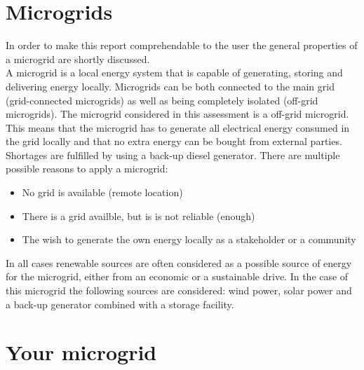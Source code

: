 \documentclass{article}[11pt]
\begin{document}
\begin{large}  \end{large}

\section*{Microgrids}\begin{multicols}{2}\setlength{\parindent}{0pt}

In order to make this report comprehendable to the user the general properties of a microgrid are shortly discussed.\\ A microgrid is a local energy system that is capable of generating, storing and delivering energy locally. Microgrids can be both connected to the main grid (grid-connected microgrids) as well as being completely isolated (off-grid microgrids). The microgrid considered in this assessment is a off-grid microgrid. This means that the microgrid has to generate all electrical energy consumed in the grid locally and that no extra energy can be bought from external parties. Shortages are fulfilled by using a back-up diesel generator. There are multiple possible reasons to apply a microgrid: \begin{itemize}

 \item No grid is available (remote location) 

\item There is a grid availble, but is is not reliable (enough)  

\item The wish to generate the own energy locally as a stakeholder or a community 

\end{itemize}

In all cases renewable sources are often considered as a possible source of energy for the microgrid, either from an economic or a sustainable drive. In the case of this microgrid the following sources are considered: wind power, solar power and a back-up generator combined with a storage facility.

\end{multicols}\section*{Your microgrid}\begin{multicols}{2}\setlength{\parindent}{0pt}


\end{multicols}
\end{document}
